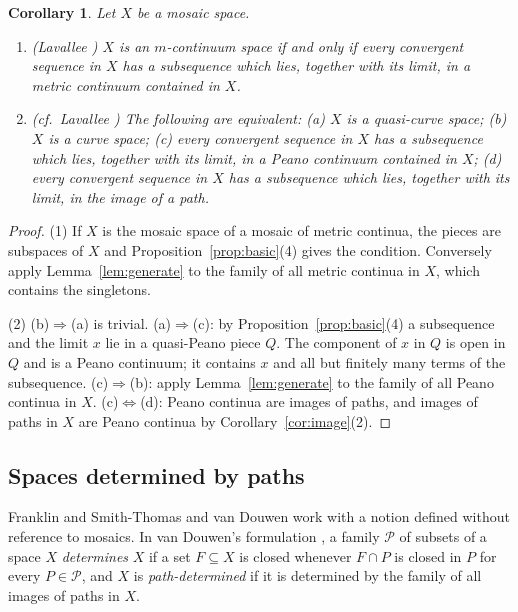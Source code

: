 \documentclass[11pt]{amsart}
\newtheorem{corollary}[theorem]{Corollary}
\theoremstyle{definition}
\theoremstyle{remark}
\numberwithin{equation}{section}
\begin{document}
\begin{corollary}\label{cor:classes}
Let $X$ be a mosaic space.
\begin{enumerate}[label=\textup{(\arabic*)}]
\item \textup{(Lavallee \cite[Theorem~2.1]{lavallee64})} $X$ is an $m$-continuum space if and only if every convergent sequence in $X$ has a subsequence which lies, together with its limit, in a metric continuum contained in $X$.
\item \textup{(cf.\ Lavallee \cite[Theorem~6.1]{lavallee64})} The following are equivalent: \textup{(a)} $X$ is a quasi-curve space; \textup{(b)} $X$ is a curve space; \textup{(c)} every convergent sequence in $X$ has a subsequence which lies, together with its limit, in a Peano continuum contained in $X$; \textup{(d)} every convergent sequence in $X$ has a subsequence which lies, together with its limit, in the image of a path.
\end{enumerate}
\end{corollary}
\begin{proof}
(1) If $X$ is the mosaic space of a mosaic of metric continua, the pieces are subspaces of $X$ and Proposition~\ref{prop:basic}(4) gives the condition. Conversely apply Lemma~\ref{lem:generate} to the family of all metric continua in $X$, which contains the singletons.

(2) (b)$\Rightarrow$(a) is trivial. (a)$\Rightarrow$(c): by Proposition~\ref{prop:basic}(4) a subsequence and the limit $x$ lie in a quasi-Peano piece $Q$. The component of $x$ in $Q$ is open in $Q$ and is a Peano continuum; it contains $x$ and all but finitely many terms of the subsequence. (c)$\Rightarrow$(b): apply Lemma~\ref{lem:generate} to the family of all Peano continua in $X$. (c)$\Leftrightarrow$(d): Peano continua are images of paths, and images of paths in $X$ are Peano continua by Corollary~\ref{cor:image}(2).
\end{proof}

\subsection{Spaces determined by paths}
Franklin and Smith-Thomas \cite{fst79} and van Douwen \cite{vandouwen81} work with a notion defined without reference to mosaics. In van Douwen's formulation \cite[p.~423]{vandouwen81}, a family $\mathcal P$ of subsets of a space $X$ \emph{determines} $X$ if a set $F\subseteq X$ is closed whenever $F\cap P$ is closed in $P$ for every $P\in\mathcal P$, and $X$ is \emph{path-determined} if it is determined by the family of all images of paths in $X$.
\end{document}
